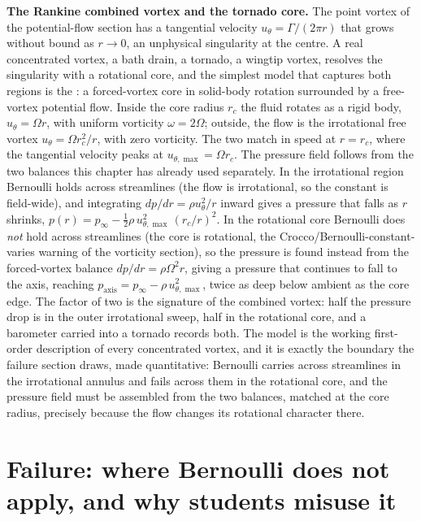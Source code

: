 \begin{mastery}
\textbf{The Rankine combined vortex and the tornado core.} The point
vortex of the potential-flow section has a tangential velocity
$u_\theta = \Gamma/(2\pi r)$ that grows without bound as $r\to 0$, an
unphysical singularity at the centre. A real concentrated vortex, a
bath drain, a tornado, a wingtip vortex, resolves the singularity with
a rotational core, and the simplest model that captures both regions is
the : a forced-vortex core in
solid-body rotation surrounded by a free-vortex potential flow. Inside
the core radius $r_c$ the fluid rotates as a rigid body, $u_\theta =
\Omega r$, with uniform vorticity $\omega = 2\Omega$; outside, the flow
is the irrotational free vortex $u_\theta = \Omega r_c^2/r$, with zero
vorticity. The two match in speed at $r = r_c$, where the tangential
velocity peaks at $u_{\theta,\max} = \Omega r_c$. The pressure field
follows from the two balances this chapter has already used
separately. In the irrotational region Bernoulli holds across
streamlines (the flow is irrotational, so the constant is field-wide),
and integrating $dp/dr = \rho u_\theta^2/r$ inward gives a pressure
that falls as $r$ shrinks, $p(r) = p_\infty - \tfrac12\rho\,
u_{\theta,\max}^2\,(r_c/r)^2$. In the rotational core Bernoulli does
\emph{not} hold across streamlines (the core is rotational, the
Crocco/Bernoulli-constant-varies warning of the vorticity section), so
the pressure is found instead from the forced-vortex balance $dp/dr =
\rho\Omega^2 r$, giving a pressure that continues to fall to the axis,
reaching $p_\text{axis} = p_\infty - \rho\,u_{\theta,\max}^2$, twice as
deep below ambient as the core edge. The factor of two is the signature
of the combined vortex: half the pressure drop is in the outer
irrotational sweep, half in the rotational core, and a barometer
carried into a tornado records both. The model is the working
first-order description of every concentrated vortex, and it is exactly
the boundary the failure section draws, made quantitative: Bernoulli
carries across streamlines in the irrotational annulus and fails across
them in the rotational core, and the pressure field must be assembled
from the two balances, matched at the core radius, precisely because
the flow changes its rotational character there.
\end{mastery}

\section{Failure: where Bernoulli does not apply, and why students misuse it}

